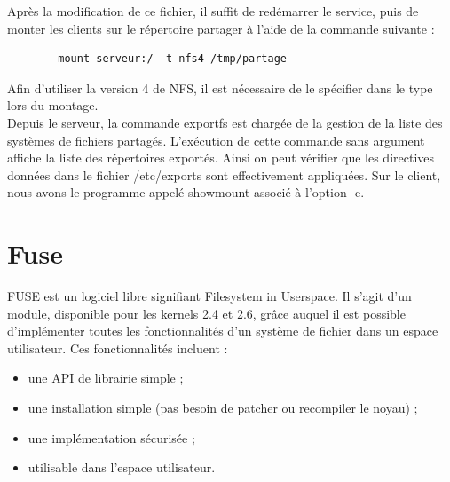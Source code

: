 \documentclass[12pt]{report}
\begin{document}
	  Après la modification de ce fichier, il suffit de redémarrer le service, puis de monter les clients sur le répertoire partager à l'aide de la commande suivante :\\
	  \begin{lstlisting}
	    mount serveur:/ -t nfs4 /tmp/partage
	  \end{lstlisting}
	  Afin d'utiliser la version 4 de NFS, il est nécessaire de le spécifier dans le type lors du montage.\\
Depuis le serveur, la commande exportfs est chargée de la gestion de la liste des systèmes de fichiers partagés. L'exécution de cette commande sans argument affiche la liste des répertoires exportés.
Ainsi on peut vérifier que les directives données dans le fichier /etc/exports sont effectivement appliquées.
Sur le client, nous avons le programme appelé showmount associé à l'option -e.

	  \chapter{Fuse}
    FUSE est un logiciel libre signifiant \og Filesystem in Userspace\fg. Il s'agit d'un module, disponible pour les kernels 2.4 et 2.6, grâce auquel 
    il est possible d'implémenter toutes les fonctionnalités d'un système de fichier dans un espace utilisateur. Ces fonctionnalités incluent :\\
	\begin{itemize}
		\item une API de librairie simple ;
		\item une installation simple (pas besoin de patcher ou recompiler le noyau) ;
		\item une implémentation sécurisée ;
		\item utilisable dans l'espace utilisateur.\\
   \end{itemize}
\end{document}
